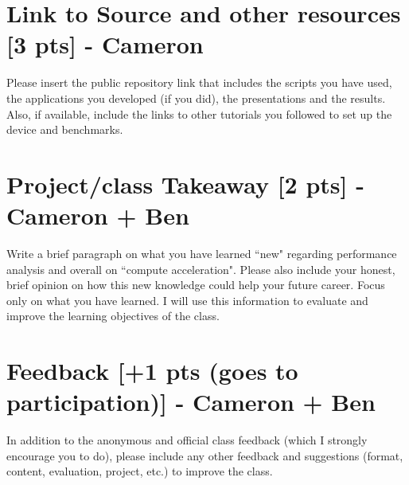 \documentclass[sigconf,authorversion,nonacm]{acmart}
\begin{document}
\section{Link to Source and other resources {\small {[3 pts]}} - Cameron} 
Please insert the public repository link that includes the scripts you have used, the applications you developed (if you did), the presentations and the results. Also, if available, include the links to other tutorials you followed to set up the device and benchmarks.

\section{Project/class Takeaway {\small {[2 pts]}} - Cameron + Ben}  
Write a brief paragraph on what you have learned ``new" regarding performance analysis and overall on ``compute acceleration". Please also include your honest, brief opinion on how this new knowledge could help your future career. Focus only on what you have learned. I will use this information to evaluate and improve the learning objectives of the class. 


\section{Feedback {\small {[+1 pts (goes to participation)]}} - Cameron + Ben}  
In addition to the anonymous and official class feedback (which I strongly encourage you to do), please include any other feedback and suggestions (format, content, evaluation, project, etc.) to improve the class.




\end{document}
